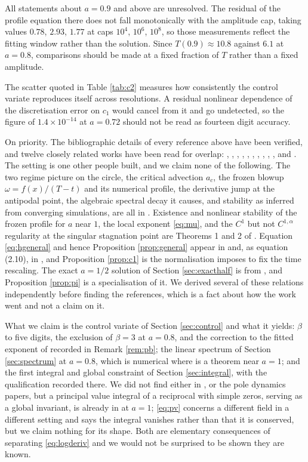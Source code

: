 \documentclass[11pt]{article}
\theoremstyle{definition}
\begin{document}
All statements about $a=0.9$ and above are unresolved. The residual of the
profile equation there does not fall monotonically with the amplitude cap,
taking values $0.78$, $2.93$, $1.77$ at caps $10^4$, $10^6$, $10^8$, so those
measurements reflect the fitting window rather than the solution. Since
$T(0.9)\approx 10.8$ against $6.1$ at $a=0.8$, comparisons should be made at a
fixed fraction of $T$ rather than a fixed amplitude.

The scatter quoted in Table \ref{tab:c2} measures how consistently the control
variate reproduces itself across resolutions. A residual nonlinear dependence
of the discretisation error on $c_1$ would cancel from it and go undetected, so
the figure of $1.4\times10^{-14}$ at $a=0.72$ should not be read as fourteen
digit accuracy.

On priority. The bibliographic details of every reference above have been
verified, and twelve closely related works have been read for overlap:
\cite{osw2008}, \cite{htw2022}, \cite{hqww2023}, \cite{hqw2024},
\cite{zheng2023}, \cite{gj2025}, \cite{htw2026}, \cite{lss2020},
\cite{slsa2025}, \cite{xu2026}, \cite{chenS1} and \cite{alss2024}. The setting
is one other people built, and we claim none of the following. The two regime
picture on the circle, the
critical advection $a_c$, the frozen blowup $\omega = f(x)/(T-t)$ and its
numerical profile, the derivative jump at the antipodal point, the algebraic
spectral decay it causes, and stability as inferred from converging
simulations, are all in \cite{lss2020}. Existence and nonlinear stability of
the frozen profile for $a$ near $1$, the local exponent \eqref{eq:mu}, and the
$C^1$ but not $C^{1,\alpha}$ regularity at the singular stagnation point are
Theorems 1 and 2 of \cite{chenS1}. Equation \eqref{eq:hgeneral} and hence
Proposition \ref{prop:general} appear in \cite{xu2026} and, as equation (2.10),
in \cite{htw2026}, and Proposition \ref{prop:c1} is the normalisation
\cite{chenS1} imposes to fix the time rescaling. The exact $a=1/2$ solution of
Section \ref{sec:exacthalf} is from \cite{slsa2025}, and Proposition
\ref{prop:pi} is a specialisation of it. We derived several of these relations
independently before finding the references, which is a fact about how the work
went and not a claim on it.

What we claim is the control variate of Section \ref{sec:control} and what it
yields: $\beta$ to five digits, the exclusion of $\beta=3$ at $a=0.8$, and the
correction to the fitted exponent of \cite{lss2020} recorded in Remark
\ref{rem:pb}; the linear spectrum of Section \ref{sec:spectrum} at $a=0.8$,
which is numerical where \cite{chenS1} is a theorem near $a=1$; and the first
integral and global constraint of Section \ref{sec:integral}, with the
qualification recorded there. We did not find either in \cite{chenS1},
\cite{htw2026} or the pole dynamics papers, but a principal value integral of a
reciprocal with simple zeros, serving as a global invariant, is already in
\cite{jss2019} at $a=1$; \eqref{eq:pv} concerns a different field in a
different setting and says the integral vanishes rather than that it is
conserved, but we claim nothing for its shape. Both are elementary consequences
of separating \eqref{eq:logderiv} and we would not be surprised to be shown
they are known.
\end{document}
